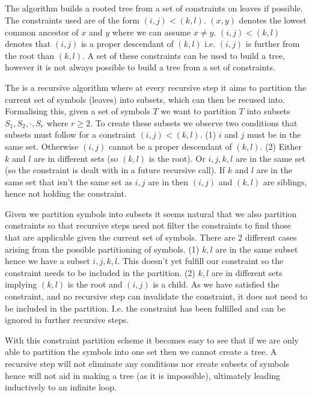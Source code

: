 \subsection{}
The  algorithm builds a rooted tree from a set of constraints on leaves if possible. The constraints used are of the form $(i,j)<(k,l)$. $(x,y)$ denotes the lowest common ancestor of $x$ and $y$ where we can assume $x \neq y$. $(i,j)<(k,l)$ denotes that $(i,j)$ is a proper descendant of $(k,l)$ i.e. $(i,j)$ is further from the root than $(k,l)$. A set of these constraints can be used to build a tree, however it is not always possible to build a tree from a set of constraints.

The  is a recursive algorithm where at every recursive step it aims to partition the current set of symbols (leaves) into subsets, which can then be  recused  into. Formalising this, given a set of symbols $T$ we want to partition $T$ into subsets $S_1, S_2, \cdot, S_r$ where $r \geq 2$. To create these subsets we observe two conditions that subsets must follow for a constraint $(i,j)<(k,l)$.
(1) $i$ and $j$ must be in the same set. Otherwise $(i, j)$ cannot be a proper descendant of $(k,l)$.
(2) Either $k$ and $l$ are in different sets (so $(k,l)$ is the root). Or $i,j,k,l$ are in the same set (so the constraint is dealt with in a future recursive call). If $k$ and $l$ are in the same set that isn't the same set as $i,j$ are in then $(i,j)$ and $(k,l)$ are siblings, hence not holding the constraint.

Given we partition symbols into subsets it seems natural that we also partition constraints so that recursive steps need not filter the constraints to find those that are applicable given the current set of symbols. There are 2 different cases arising from the possible partitioning of symbols.
(1) $k,l$ are in the same subset hence we have a subset $i,j,k,l$. This doesn't yet fulfill our constraint so the constraint needs to be included in the partition.
(2) $k,l$ are in different sets implying $(k,l)$ is the root and $(i,j)$ is a child. As we have satisfied the constraint, and no recursive step can invalidate the constraint, it does not need to be included in the partition. I.e. the constraint has been fulfilled and can be ignored in further recursive steps.

With this constraint partition scheme it becomes easy to see that if we are only able to partition the symbols into one set then we cannot create a tree. A recursive step will not eliminate any conditions nor create subsets of symbols hence will not aid in making a tree (as it is impossible), ultimately leading inductively to an infinite loop.

